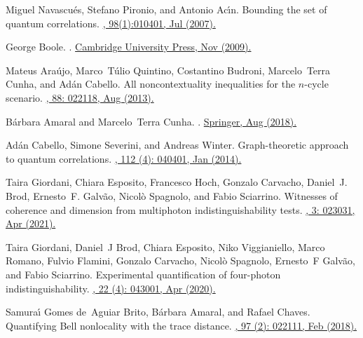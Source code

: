 \documentclass[letterpaper,onecolumn,12pt,accepted=2024-01-17]{article}
\begin{document}
\begin{thebibliography}{100}
Miguel Navascu{\'e}s, Stefano Pironio, and Antonio Ac{\'\i}n.
\newblock Bounding the set of quantum correlations.
\href{https://doi.org/10.1103/PhysRevLett.98.010401}{, 98(1):010401, Jul (2007).}

George Boole.
.
\href{https://doi.org/10.1017/CBO9780511693090}{\newblock Cambridge University Press, Nov (2009).}

Mateus Ara\'ujo, Marco~T\'ulio Quintino, Costantino Budroni, Marcelo~Terra
  Cunha, and Ad\'an Cabello.
\newblock All noncontextuality inequalities for the $n$-cycle scenario.
\href{https://doi.org/10.1103/PhysRevA.88.022118}{, 88: 022118, Aug (2013).}

B\'{a}rbara Amaral and Marcelo~Terra Cunha.
.
\href{https://doi.org/10.1007/978-3-319-93827-1}{\newblock Springer, Aug (2018).}

Ad{\'a}n Cabello, Simone Severini, and Andreas Winter.
\newblock Graph-theoretic approach to quantum correlations.
\href{https://doi.org/10.1103/PhysRevLett.112.040401}{, 112 (4): 040401, Jan (2014).}

Taira Giordani, Chiara Esposito, Francesco Hoch, Gonzalo Carvacho, Daniel~J.
  Brod, Ernesto~F. Galv\~ao, Nicol\`o Spagnolo, and Fabio Sciarrino.
\newblock Witnesses of coherence and dimension from multiphoton indistinguishability tests.
\href{https://doi.org/10.1103/PhysRevResearch.3.023031}{, 3: 023031, Apr (2021).}

Taira Giordani, Daniel~J Brod, Chiara Esposito, Niko Viggianiello, Marco
  Romano, Fulvio Flamini, Gonzalo Carvacho, Nicol{\`o} Spagnolo, Ernesto~F
  Galv{\~a}o, and Fabio Sciarrino.
\newblock Experimental quantification of four-photon indistinguishability.
\href{http://dx.doi.org/10.1088/1367-2630/ab7a30}{, 22 (4): 043001, Apr (2020).}

Samura{\'\i} Gomes de~Aguiar Brito, B\'{a}rbara Amaral, and Rafael Chaves.
\newblock Quantifying {B}ell nonlocality with the trace distance.
\href{https://doi.org/10.1103/PhysRevA.97.022111}{, 97 (2): 022111, Feb (2018).}


\end{thebibliography}
\end{document}

